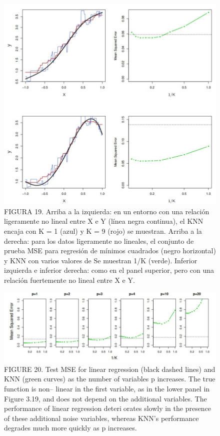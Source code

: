 \documentclass[
  letterpaper,
  DIV=11,
  numbers=noendperiod]{scrartcl}
\begin{document}
\begin{figure}

{\centering \includegraphics{images/l3.jpg}

}

\caption{FIGURA 19. Arriba a la izquierda: en un entorno con una
relación ligeramente no lineal entre X e Y (línea negra continua), el
KNN encaja con K = 1 (azul) y K = 9 (rojo) se muestran. Arriba a la
derecha: para los datos ligeramente no lineales, el conjunto de prueba
MSE para regresión de mínimos cuadrados (negro horizontal) y KNN con
varios valores de Se muestran 1/K (verde). Inferior izquierda e inferior
derecha: como en el panel superior, pero con una relación fuertemente no
lineal entre X e Y.}

\end{figure}

\begin{figure}

{\centering \includegraphics{images/l4.jpg}

}

\caption{FIGURE 20. Test MSE for linear regression (black dashed lines)
and KNN (green curves) as the number of variables p increases. The true
function is non-- linear in the first variable, as in the lower panel in
Figure 3.19, and does not depend on the additional variables. The
performance of linear regression deteriorates slowly in the presence of
these additional noise variables, whereas KNN's performance degrades
much more quickly as p increases.}

\end{figure}
\end{document}

